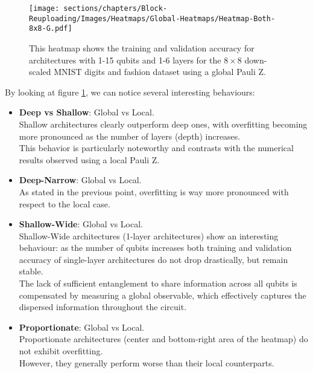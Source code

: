 
\begin{figure}[h]
    \centering
    \texttt{[image: sections/chapters/Block-Reuploading/Images/Heatmaps/Global-Heatmaps/Heatmap-Both-8x8-G.pdf]}
    \caption{This heatmap shows the training and validation accuracy for architectures with 1-15 qubits and
    1-6 layers for the $8\times8$ down-scaled MNIST digits and fashion dataset using a global Pauli Z.}
    \label{fig:heatmap-8x8-G}
\end{figure}


By looking at figure \ref{fig:heatmap-8x8-G}, we can notice 
several interesting behaviours:

\begin{itemize}
    \item \textbf{Deep vs Shallow}: Global vs Local.\\
    Shallow architectures clearly outperform deep ones, with overfitting becoming more pronounced 
    as the number of layers (depth) increases.\\
    This behavior is particularly noteworthy and contrasts with the numerical results observed 
    using a local Pauli Z.
    \item \textbf{Deep-Narrow}: Global vs Local.\\
    As stated in the previous point, overfitting is way more pronounced with respect to the local case.
    \item \textbf{Shallow-Wide}: Global vs Local.\\
    Shallow-Wide architectures (1-layer architectures) show an interesting behaviour: as the number of 
    qubits increases both training and validation accuracy of single-layer architectures 
    do not drop drastically, but remain stable.\\
    The lack of sufficient entanglement to share information across all qubits is compensated by 
    measuring a global observable, which effectively captures the dispersed information throughout the 
    circuit.
    \item \textbf{Proportionate}: Global vs Local.\\
    Proportionate architectures (center and bottom-right area of the heatmap) do not exhibit overfitting. \\
    However, they generally perform worse than their local counterparts.
 \end{itemize}